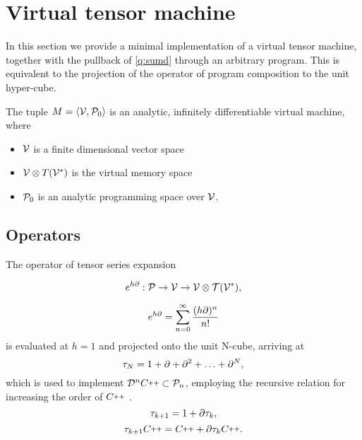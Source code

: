 \section{Virtual tensor machine}\label{sec:analyticVmachine}

In this section we provide a minimal implementation of a virtual tensor machine, together with the pullback of \eqref{q:sumd} through an arbitrary program. This is equivalent to the projection of the operator of program composition to the unit hyper-cube. 

\begin{definicija}
The tuple $M=\langle \mathcal{V},\mathcal{P}_0\rangle$ is an analytic, infinitely  differentiable virtual machine, where
   
    \begin{itemize}
    \item
    $\mathcal{V}$ is a finite dimensional vector space
    \item
    $\mathcal{V}\otimes T(\mathcal{V}^*)$ is the virtual memory space
    \item
    $\mathcal{P}_0$ is an analytic programming space over $\mathcal{V}$.
    \end{itemize}
  \end{definicija}

  \subsection{Operators}\label{sec:operators}
        
        The operator of tensor series expansion \cite[Theorem~5.1]{OperationalCalculus}
        
        \begin{equation}\label{eq:specProg}
                  	e^{h\partial}:\mathcal{P}\to\mathcal{V}\to \mathcal{V}\otimes \mathcal{T}(\mathcal{V}^*),
                  \end{equation}
        
        \begin{equation}
         	e^{h\partial}=\sum\limits_{n=0}^{\infty}\frac{(h\partial)^n}{n!}
         \end{equation}
         is evaluated at $h=1$ and projected onto the unit N-cube, arriving at 
        \begin{equation}\label{eq:DD}
          	\tau_N = 1+\partial +\partial^2 +\ldots + \partial^N,
          \end{equation}
        which is used to implement $\DD^n\CC\subset\dP_n$, employing the recursive relation for increasing the order of $\CC$ \cite[Proposition~5.1]{OperationalCalculus}.
        \begin{equation}
              \label{eq:rekurzija}
              \tau_{k+1} = 1+\partial\tau_k,
            \end{equation}
        \begin{equation}
        \sumd_{k+1}\CC = \CC+\D\sumd_k\CC.
        \end{equation}
        
